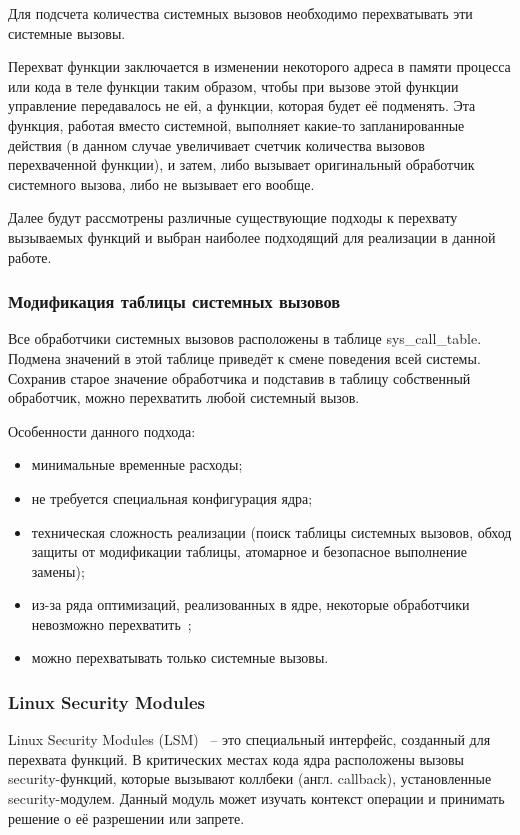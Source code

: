 Для подсчета количества системных вызовов необходимо перехватывать эти системные вызовы.

Перехват функции заключается в изменении некоторого адреса в памяти процесса или кода в теле функции таким образом, чтобы при вызове этой функции управление передавалось не ей, а функции, которая будет её подменять. Эта функция, работая вместо системной, выполняет какие-то запланированные действия (в данном случае увеличивает счетчик количества вызовов перехваченной функции), и затем, либо вызывает оригинальный обработчик системного вызова, либо не вызывает его вообще.

Далее будут рассмотрены различные существующие подходы к перехвату вызываемых функций и выбран наиболее подходящий для реализации в данной работе.

\subsubsection{Модификация таблицы системных вызовов}

Все обработчики системных вызовов расположены в таблице sys\_call\_table. Подмена значений в этой таблице приведёт к смене поведения всей системы. Сохранив старое значение обработчика и подставив в таблицу собственный обработчик, можно перехватить любой системный вызов.

Особенности данного подхода:

\begin{itemize}
	\item минимальные временные расходы;
	\item не требуется специальная конфигурация ядра;
	\item техническая сложность реализации (поиск таблицы системных вызовов, обход защиты от модификации таблицы, атомарное и безопасное выполнение замены);
	\item из-за ряда оптимизаций, реализованных в ядре, некоторые обработчики невозможно перехватить~\cite{habr-profiling-linux};
	\item можно перехватывать только системные вызовы.
\end{itemize}

\subsubsection{Linux Security Modules}

Linux Security Modules (LSM)~\cite{linux-security-api} -- это специальный интерфейс, созданный для перехвата функций. В критических местах кода ядра расположены вызовы security-функций, которые вызывают коллбеки (англ. callback), установленные security-модулем. Данный модуль может изучать контекст операции и принимать решение о её разрешении или запрете.


